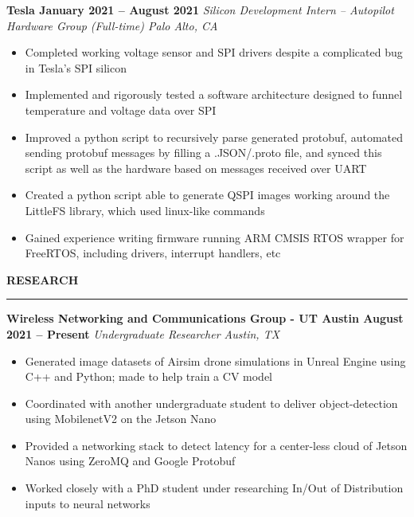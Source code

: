 \documentclass[12pt, a4paper]{article}
\begin{document}
\vspace{-\topsep}
%
%
\noindent\textbf{{\fontsize{12}{14}\selectfont Tesla \hfill January 2021 – August 2021}}\newline
\emph{Silicon Development Intern – Autopilot Hardware Group (Full-time) \hfill Palo Alto, CA}\newline
\vspace{-\topsep}
\begin{itemize}
  \setlength{\itemindent}{-6mm}
  \vspace{-0.2cm}\item Completed working voltage sensor and SPI drivers despite a complicated bug in Tesla’s SPI silicon
  \vspace{-0.2cm}\item Implemented and rigorously tested a software architecture designed to funnel temperature and voltage data over SPI
  \vspace{-0.2cm}\item Improved a python script to recursively parse generated protobuf, automated sending protobuf messages by filling a .JSON/.proto file, and synced this script as well as the hardware based on messages received over UART
  \vspace{-0.2cm}\item Created a python script able to generate QSPI images working around the LittleFS library, which used linux-like commands
  \vspace{-0.2cm}\item Gained experience writing firmware running ARM CMSIS RTOS wrapper for FreeRTOS, including drivers, interrupt handlers, etc
\end{itemize}
\vspace{-0.1cm}
%
%
\textbf{{\fontsize{12}{14}\selectfont RESEARCH}}\newline
\vspace{-0.8cm}\newline
\rule{18.5cm}{0.4pt}
\noindent\textbf{{\fontsize{12}{14}\selectfont Wireless Networking and Communications Group - UT Austin \hfill August 2021 – Present}}\newline
\emph{Undergraduate Researcher \hfill Austin, TX}\newline
\vspace{-\topsep}
\begin{itemize}
  \setlength{\itemindent}{-6mm}
  \vspace{-0.2cm}\item Generated image datasets of Airsim drone simulations in Unreal Engine using C++ and Python; made to help train a CV model
  \vspace{-0.2cm}\item Coordinated with another undergraduate student to deliver object-detection using MobilenetV2 on the Jetson Nano
  \vspace{-0.2cm}\item Provided a networking stack to detect latency for a center-less cloud of Jetson Nanos using ZeroMQ and Google Protobuf
  \vspace{-0.2cm}\item Worked closely with a PhD student under researching In/Out of Distribution inputs to neural networks
\end{itemize}
\end{document}
